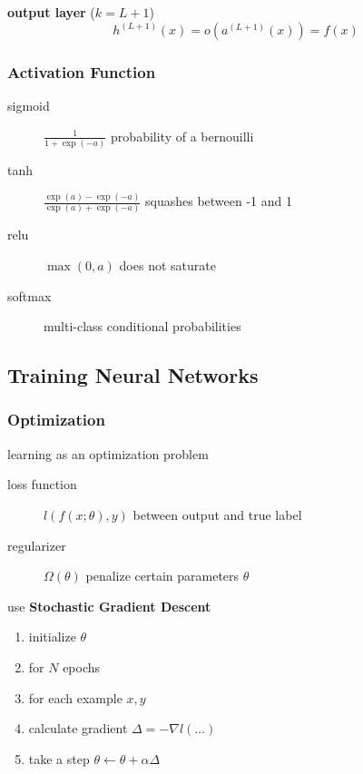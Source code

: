 \documentclass[]{article}
\theoremstyle{definition}
\begin{document}
    \textbf{output layer} ($k = L+1$)
    \begin{equation*}
        h^{(L+1)}(x) = o(a^{(L+1)}(x)) = f(x)
    \end{equation*}

    \subsubsection{Activation Function}%
    \label{ssub:activation_function}

    \begin{description}
        \item[sigmoid] $\frac{1}{1 + \exp(-a)}$ probability of a bernouilli
        \item[tanh] $\frac{\exp(a) - \exp(-a)}{\exp(a) + \exp(-a)}$ squashes between -1 and 1
        \item[relu] $\max(0,a)$ does not saturate
        \item[softmax] multi-class conditional probabilities
    \end{description}

    \subsection{Training Neural Networks}%
    \label{sub:training_neural_networks}

    \subsubsection{Optimization}%
    \label{ssub:optimization}

    learning as an optimization problem
    \begin{description}
        \item[loss function] $l(f(x;\theta), y)$ between output and true label
        \item[regularizer] $\Omega(\theta)$ penalize certain parameters $\theta$
    \end{description}
    use \textbf{Stochastic Gradient Descent}
    \begin{enumerate}
        \item initialize $\theta$
        \item[]for $N$ epochs
        \item[]for each example $x,y$
        \item calculate gradient $\Delta = -\nabla l(\ldots)$
        \item take a step $\theta \gets \theta + \alpha \Delta$
    \end{enumerate}
\end{document}
